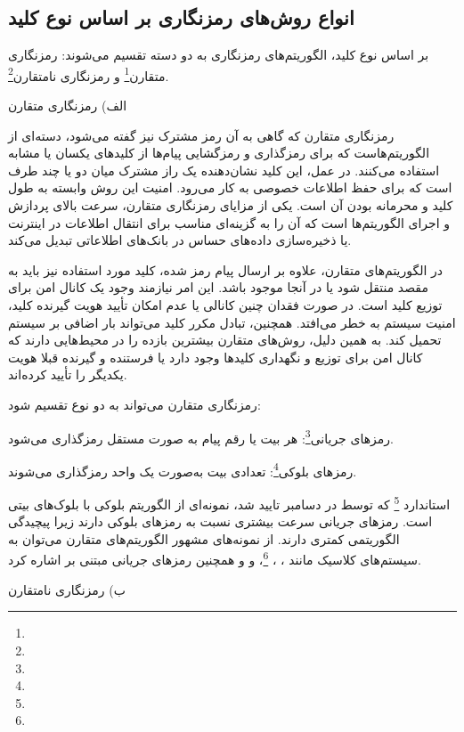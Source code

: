 \subsection{انواع روش‌های رمزنگاری بر اساس نوع کلید}

بر اساس نوع کلید، الگوریتم‌های رمزنگاری به دو دسته تقسیم می‌شوند: رمزنگاری متقارن\footnote{} و رمزنگاری نامتقارن\footnote{}\cite{ref25}.

الف) رمزنگاری متقارن

رمزنگاری متقارن که گاهی به آن رمز مشترک نیز گفته می‌شود، دسته‌ای از الگوریتم‌هاست که برای رمزگذاری و رمزگشایی پیام‌ها از کلیدهای یکسان یا مشابه استفاده می‌کنند. در عمل، این کلید نشان‌دهنده یک راز مشترک میان دو یا چند طرف است که برای حفظ اطلاعات خصوصی به کار می‌رود. امنیت این روش وابسته به طول کلید و محرمانه بودن آن است. یکی از مزایای رمزنگاری متقارن، سرعت بالای پردازش و اجرای الگوریتم‌ها است که آن را به گزینه‌ای مناسب برای انتقال اطلاعات در اینترنت یا ذخیره‌سازی داده‌های حساس در بانک‌های اطلاعاتی تبدیل می‌کند\cite{ref26}.

در الگوریتم‌های متقارن، علاوه بر ارسال پیام رمز شده، کلید مورد استفاده نیز باید به مقصد منتقل شود یا در آنجا موجود باشد. این امر نیازمند وجود یک کانال امن برای توزیع کلید است. در صورت فقدان چنین کانالی یا عدم امکان تأیید هویت گیرنده کلید، امنیت سیستم به خطر می‌افتد. همچنین، تبادل مکرر کلید می‌تواند بار اضافی بر سیستم تحمیل کند. به همین دلیل، روش‌های متقارن بیشترین بازده را در محیط‌هایی دارند که کانال امن برای توزیع و نگهداری کلیدها وجود دارد یا فرستنده و گیرنده قبلا هویت یکدیگر را تأیید کرده‌اند.

رمزنگاری متقارن می‌تواند به دو نوع تقسیم شود:

رمزهای جریانی\footnote{}: هر بیت یا رقم پیام به صورت مستقل رمزگذاری می‌شود.

رمزهای بلوکی\footnote{}: تعدادی بیت به‌صورت یک واحد رمزگذاری می‌شوند.

استاندارد \footnote{} که توسط  در دسامبر  تایید شد، نمونه‌ای از الگوریتم بلوکی با بلوک‌های  بیتی است. رمزهای جریانی سرعت بیشتری نسبت به رمزهای بلوکی دارند زیرا پیچیدگی الگوریتمی کمتری دارند. از نمونه‌های مشهور الگوریتم‌های متقارن می‌توان به سیستم‌های کلاسیک مانند ، ، \footnote{}،  و  و همچنین رمزهای جریانی مبتنی بر  اشاره کرد\cite{ref25, ref27}.

ب) رمزنگاری نامتقارن

